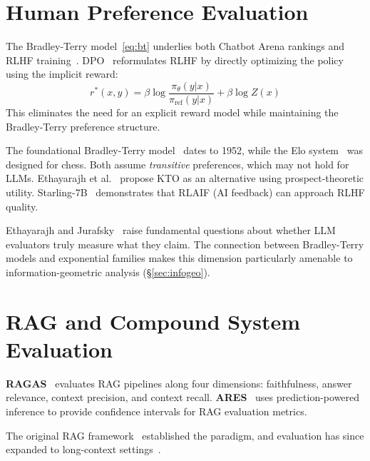 \documentclass[11pt]{article}
\begin{document}
\section{Human Preference Evaluation}
\label{sec:preference}

The Bradley-Terry model~\eqref{eq:bt} underlies both Chatbot Arena rankings and RLHF training~\cite{ouyang2022training}. DPO~\cite{rafailov2023direct} reformulates RLHF by directly optimizing the policy using the implicit reward:
\begin{equation}
r^*(x, y) = \beta \log \frac{\pi_\theta(y|x)}{\pi_{\text{ref}}(y|x)} + \beta \log Z(x)
\end{equation}
This eliminates the need for an explicit reward model while maintaining the Bradley-Terry preference structure.

The foundational Bradley-Terry model~\cite{bradley1952rank} dates to 1952, while the Elo system~\cite{elo1978rating} was designed for chess. Both assume \emph{transitive} preferences, which may not hold for LLMs. Ethayarajh et al.~\cite{ethayarajh2024kto} propose KTO as an alternative using prospect-theoretic utility. Starling-7B~\cite{zhu2024starling} demonstrates that RLAIF (AI feedback) can approach RLHF quality.

Ethayarajh and Jurafsky~\cite{ethayarajh2022authenticity} raise fundamental questions about whether LLM evaluators truly measure what they claim. The connection between Bradley-Terry models and exponential families makes this dimension particularly amenable to information-geometric analysis (\S\ref{sec:infogeo}).

\section{RAG and Compound System Evaluation}
\label{sec:compound}

\textbf{RAGAS}~\cite{es2023ragas} evaluates RAG pipelines along four dimensions: faithfulness, answer relevance, context precision, and context recall. \textbf{ARES}~\cite{saadfalcon2023ares} uses prediction-powered inference to provide confidence intervals for RAG evaluation metrics.

The original RAG framework~\cite{lewis2020rag} established the paradigm, and evaluation has since expanded to long-context settings~\cite{bai2023longbench}.
\end{document}
